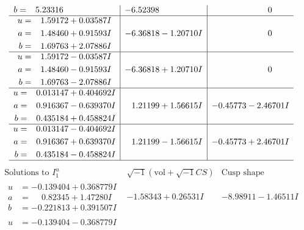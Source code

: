 \documentclass[1p]{elsarticle_modified}
\theoremstyle{definition}
\newcommand{\I}{\sqrt{-1}}
\begin{document}
$$\begin{array}{c|c|c}
\begin{aligned}
b &= \phantom{-}5.23316\phantom{ +0.000000I}\end{aligned}
 & -6.52398\phantom{ +0.000000I} & \phantom{-0.000000 } 0 \\ \hline\begin{aligned}
u &= \phantom{-}1.59172 + 0.03587 I \\
a &= \phantom{-}1.48460 + 0.91593 I \\
b &= \phantom{-}1.69763 + 2.07886 I\end{aligned}
 & -6.36818 - 1.20710 I & \phantom{-0.000000 } 0 \\ \hline\begin{aligned}
u &= \phantom{-}1.59172 - 0.03587 I \\
a &= \phantom{-}1.48460 - 0.91593 I \\
b &= \phantom{-}1.69763 - 2.07886 I\end{aligned}
 & -6.36818 + 1.20710 I & \phantom{-0.000000 } 0 \\ \hline\begin{aligned}
u &= \phantom{-}0.013147 + 0.404692 I \\
a &= \phantom{-}0.916367 - 0.639370 I \\
b &= \phantom{-}0.435184 + 0.458824 I\end{aligned}
 & \phantom{-}1.21199 + 1.56615 I & -0.45773 - 2.46701 I \\ \hline\begin{aligned}
u &= \phantom{-}0.013147 - 0.404692 I \\
a &= \phantom{-}0.916367 + 0.639370 I \\
b &= \phantom{-}0.435184 - 0.458824 I\end{aligned}
 & \phantom{-}1.21199 - 1.56615 I & -0.45773 + 2.46701 I\\
 \hline 
 \end{array}$$\newpage$$\begin{array}{c|c|c}  
\text{Solutions to }I^u_{1}& \I (\text{vol} + \sqrt{-1}CS) & \text{Cusp shape}\\
 \hline 
\begin{aligned}
u &= -0.139404 + 0.368779 I \\
a &= \phantom{-}0.82345 + 1.47280 I \\
b &= -0.221813 + 0.391507 I\end{aligned}
 & -1.58343 + 0.26531 I & -8.98911 - 1.46511 I \\ \hline\begin{aligned}
u &= -0.139404 - 0.368779 I \\

\end{aligned}
\end{array}$$
\end{document}
